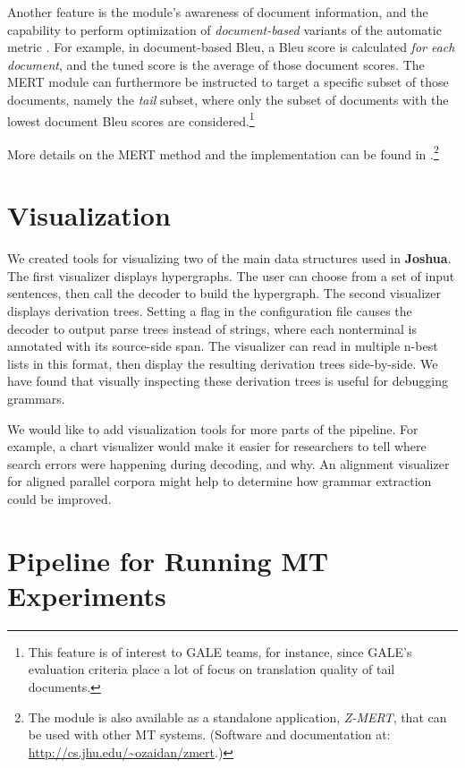 \documentclass[11pt]{article}
\newcommand{\joshua}{\textbf{Joshua}\xspace}
\begin{document}
Another feature is the module's awareness of document information, and the
capability to perform optimization of {\em document-based} variants of the
automatic metric \cite{atypical-mert}. For example, in document-based Bleu,
a Bleu score is calculated {\em for each document}, and the tuned score is the
average of those document scores. The MERT module can furthermore be instructed
to target a specific subset of those documents, namely the {\em tail} subset,
where only the subset of documents with the lowest document Bleu scores are
considered.\footnote{This feature is of interest to GALE teams, for instance,
since GALE's evaluation criteria place a lot of focus on translation quality of
tail documents.}

More details on the MERT method and the
implementation can be found in .\footnote{The module
is also available as a standalone application, {\em Z-MERT}, that can be used
with other MT systems. (Software and documentation at: \url{http://cs.jhu.edu/~ozaidan/zmert}.)}


\section{Visualization}

We created tools for visualizing two of the main data structures used
in \joshua \cite{PBML-2010-Joshua-visualization}. The first visualizer displays hypergraphs. The user can choose from
a set of input sentences, then call the decoder to build the hypergraph.
The second  visualizer displays derivation trees. Setting a flag in the configuration file causes the decoder to output parse trees instead of strings, where each nonterminal is annotated with its source-side
span. The visualizer can read in multiple n-best lists in this format, then
display the resulting derivation trees side-by-side. We have found that
visually inspecting these derivation trees is useful for debugging
grammars.

We would like to add visualization tools for more parts of the pipeline. For
example, a chart visualizer would make it easier for researchers to tell where
search errors were happening during decoding, and why. An alignment visualizer
for aligned parallel corpora might help to determine how grammar extraction 
could be improved.


\section{Pipeline for Running MT Experiments}
\end{document}
